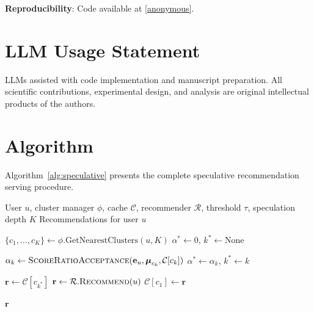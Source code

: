 \documentclass{article}
\begin{document}
\textbf{Reproducibility}: Code available at \url{[anonymous]}.

\section*{LLM Usage Statement}
LLMs assisted with code implementation and manuscript preparation. All scientific contributions, experimental design, and analysis are original intellectual products of the authors.




\newpage
\appendix
\section{Algorithm}
\label{app:algorithm}

Algorithm~\ref{alg:speculative} presents the complete speculative recommendation serving procedure.

\begin{algorithm}[h]
\caption{Speculative Recommendation Serving}
\label{alg:speculative}
\begin{algorithmic}[1]
\REQUIRE User $u$, cluster manager $\phi$, cache $\mathcal{C}$, recommender $\mathcal{R}$, threshold $\tau$, speculation depth $K$
\ENSURE Recommendations for user $u$

\STATE $\{c_1, \ldots, c_K\} \leftarrow \phi.\text{GetNearestClusters}(u, K)$
\STATE $\alpha^* \leftarrow 0$, $k^* \leftarrow \text{None}$

        \STATE $\alpha_k \leftarrow \textsc{ScoreRatioAcceptance}(\mathbf{e}_u, \boldsymbol{\mu}_{c_k}, \mathcal{C}[c_k])$ 
            \STATE $\alpha^* \leftarrow \alpha_k$, $k^* \leftarrow k$
        \ENDIF
    \ENDIF
\ENDFOR

\IF{$\alpha^* \geq \tau$}
    \STATE $\mathbf{r} \leftarrow \mathcal{C}[c_{k^*}]$ 
\ELSE
    \STATE $\mathbf{r} \leftarrow \mathcal{R}.\textsc{Recommend}(u)$ 
    \STATE $\mathcal{C}[c_1] \leftarrow \mathbf{r}$ 
\ENDIF

\RETURN $\mathbf{r}$
\end{algorithmic}
\end{algorithm}
\end{document}
